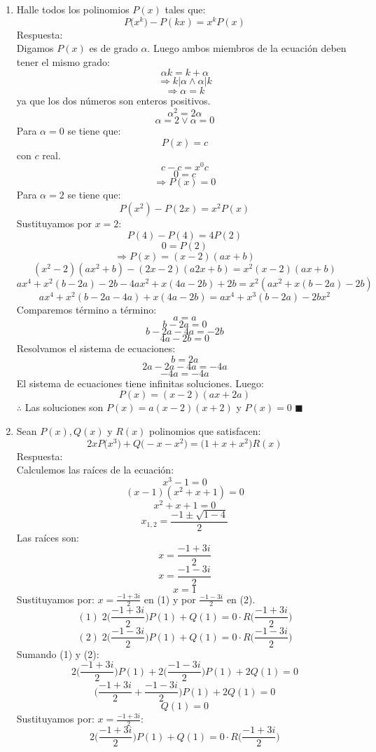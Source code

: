 \documentclass{book}
\begin{document}
\begin{enumerate}
        \item Halle todos los polinomios $P(x)$ tales que:
        $$P\big(x^k\big)-P(kx)=x^kP(x)$$
        Respuesta:\\
        Digamos $P(x)$ es de grado $\alpha$. Luego ambos miembros de la ecuación deben tener el mismo grado:
        $$\alpha k=k+\alpha$$
        $$\Rightarrow k|\alpha \wedge \alpha|k$$
        $$\Rightarrow\alpha=k $$
        ya que los dos números son enteros positivos.
        $$\alpha^2=2\alpha$$
        $$\alpha=2 \vee \alpha=0$$
        Para $\alpha=0$ se tiene que:
        $$P(x)=c$$
        con $c$ real.
        $$c-c=x^0 c$$
        $$0=c$$
        $$\Rightarrow P(x)=0$$
        Para $\alpha=2$ se tiene que:
        $$P(x^2 )-P(2x)=x^2 P(x)$$
        Sustituyamos por $x=2$:
        $$P(4)-P(4)=4P(2)$$
        $$0=P(2)$$
        $$\Rightarrow P(x)=(x-2)(ax+b)$$
        $$(x^2-2)(ax^2+b)-(2x-2)(a2x+b)=x^2 (x-2)(ax+b)$$
        $$ax^4+x^2 (b-2a)-2b-4ax^2+x(4a-2b)+2b=x^2 (ax^2+x(b-2a)-2b)$$
        $$ax^4+x^2 (b-2a-4a)+x(4a-2b)=ax^4+x^3 (b-2a)-2bx^2$$
        Comparemos término a término:
        $$a=a$$
        $$b-2a=0$$
        $$b-2a-4a=-2b$$
        $$4a-2b=0$$
        Resolvamos el sistema de ecuaciones:
        $$b=2a$$
        $$2a-2a-4a=-4a$$
        $$-4a=-4a$$
        El sistema de ecuaciones tiene infinitas soluciones. Luego:
        $$P(x)=(x-2)(ax+2a)$$
        $\therefore$ Las soluciones son $P(x)=a(x-2)(x+2)$ y $P(x)=0$ $\blacksquare$\\
        \item Sean $P(x),Q(x)$ y $R(x)$ polinomios que satisfacen:
        $$2xP\big(x^3\big)+Q\big(-x-x^2\big)=\big(1+x+x^2\big)R(x)$$
        Respuesta:\\
        Calculemos las raíces de la ecuación:
        $$x^3-1=0$$
        $$(x-1)(x^2+x+1)=0$$
        $$x^2+x+1=0$$
        $$x_{1,2}=\frac{-1\pm\sqrt{1-4}}{2}$$
        Las raíces son:
        $$x=\frac{-1+3i}{2}$$
        $$x=\frac{-1-3i}{2}$$
        $$x=1$$
        Sustituyamos por:  $\displaystyle{x=\frac{-1+3i}{2}}$ en (1) y por $\displaystyle{\frac{-1-3i}{2}}$ en (2).
        $$(1) \;   2\bigg(\frac{-1+3i}{2}\bigg)P(1)+Q(1)=0\cdot R\bigg(\frac{-1+3i}{2}\bigg)$$
        $$ (2)\;     2\bigg(\frac{-1-3i}{2}\bigg)P(1)+Q(1)=0\cdot R\bigg(\frac{-1-3i}{2}\bigg)$$
        Sumando (1) y (2):
        $$ 2\bigg(\frac{-1+3i}{2}\bigg)P(1)+2\bigg(\frac{-1-3i}{2}\bigg)P(1)+2Q(1)=0$$
        $$ \bigg(\frac{-1+3i}{2}+\frac{-1-3i}{2}\bigg)P(1)+2Q(1)=0$$
        $$Q(1)=0$$
        Sustituyamos por:  $\displaystyle{x=\frac{-1+3i}{2}}$:
        $$2\bigg(\frac{-1+3i}{2}\bigg)P(1)+Q(1)=0\cdot R \bigg(\frac{-1+3i}{2}\bigg)$$

\end{enumerate}
\end{document}
